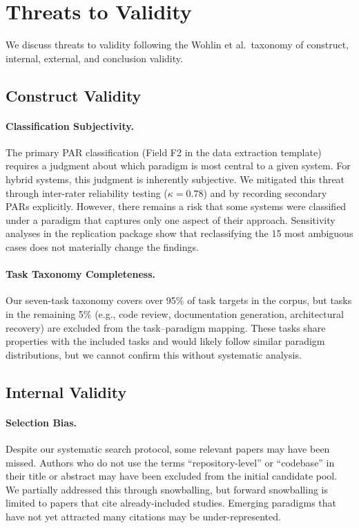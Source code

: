 \section{Threats to Validity}
\label{sec:threats}

We discuss threats to validity following the Wohlin et al.\ taxonomy of construct,
internal, external, and conclusion validity.

\subsection{Construct Validity}

\paragraph{Classification Subjectivity.}
The primary PAR classification (Field F2 in the data extraction template) requires a judgment
about which paradigm is most central to a given system. For hybrid systems, this judgment is
inherently subjective. We mitigated this threat through inter-rater reliability testing
($\kappa = 0.78$) and by recording secondary PARs explicitly. However, there remains a risk
that some systems were classified under a paradigm that captures only one aspect of their
approach. Sensitivity analyses in the replication package show that reclassifying the 15 most
ambiguous cases does not materially change the findings.

\paragraph{Task Taxonomy Completeness.}
Our seven-task taxonomy covers over 95\% of task targets in the corpus, but tasks in the
remaining 5\% (e.g., code review, documentation generation, architectural recovery) are
excluded from the task--paradigm mapping. These tasks share properties with the included tasks
and would likely follow similar paradigm distributions, but we cannot confirm this without
systematic analysis.

\subsection{Internal Validity}

\paragraph{Selection Bias.}
Despite our systematic search protocol, some relevant papers may have been missed. Authors
who do not use the terms ``repository-level'' or ``codebase'' in their title or abstract may
have been excluded from the initial candidate pool. We partially addressed this through
snowballing, but forward snowballing is limited to papers that cite already-included studies.
Emerging paradigms that have not yet attracted many citations may be under-represented.

